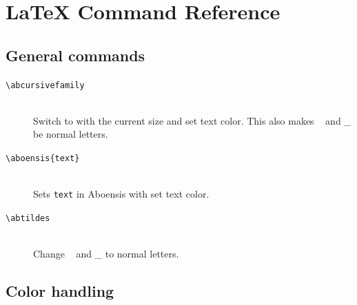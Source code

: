 \documentclass[a4paper]{article}
\newcommand{\package}[1]{\texttt{#1}}
\newcommand{\ltxncmd}[1]{\texttt{\textbackslash{}#1}}
\newcommand{\ltxcmd}[2]{\texttt{\textbackslash{}#1\{#2\}}}
\begin{document}

\section{LaTeX Command Reference }\label{reference}

\subsection{General commands}
\begin{description}
\item [\ltxncmd{abcursivefamily}] \mbox{} \\
  Switch to \Aboensis{} with the current size and set text color. This
  also makes \emph{~} and \emph{_} be normal letters.

\item [\ltxcmd{aboensis}{text}] \mbox{} \\
  Sets \package{text} in Aboensis with set text color. 

\item [\ltxncmd{abtildes}] \mbox{} \\
  Change \emph{~} and \emph{_} to normal letters. 

\end{description}

\subsection{Color handling}
\end{document}
